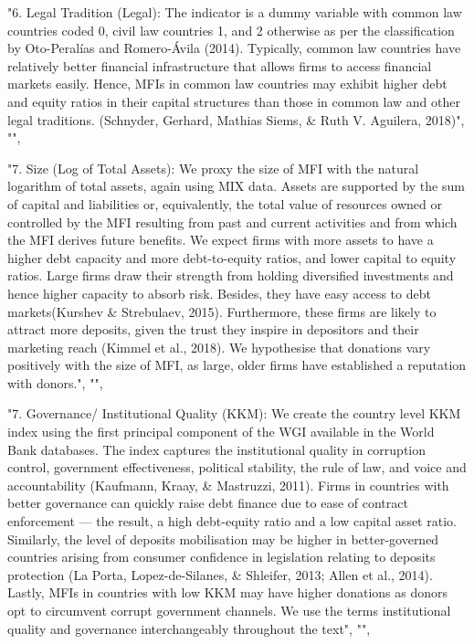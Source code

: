 \documentclass[a4paper,nobind]{templates/ociamthesis}
\newenvironment{Shaded}{\begin{snugshade}}{\end{snugshade}}
\newcommand{\NormalTok}[1]{#1}
\newcommand{\StringTok}[1]{\textcolor[rgb]{0.31,0.60,0.02}{#1}}
\renewenvironment{Shaded}
{
  \vspace{10pt}%
  \begin{snugshade}%
}{%
  \end{snugshade}%
  \vspace{8pt}%
}
\begin{document}
\begin{Shaded}
\begin{Highlighting}[]
\StringTok{"6. Legal Tradition (Legal): The indicator is a dummy variable with common law countries coded 0, civil law countries 1, and 2 otherwise as per the classification by Oto{-}Peralías and Romero{-}Ávila (2014). Typically, common law countries have relatively better financial infrastructure that allows firms to access financial markets easily. Hence, MFIs in common law countries may exhibit higher debt and equity ratios in their capital structures than those in common law and other legal traditions. (Schnyder, Gerhard, Mathias Siems, \& Ruth V. Aguilera, 2018)"}\NormalTok{, }\StringTok{""}\NormalTok{, }

\StringTok{"7. Size (Log of Total Assets): We proxy the size of MFI with the natural logarithm of total assets, again using MIX data. Assets are supported by the sum of capital and liabilities or, equivalently, the total value of resources owned or controlled by the MFI resulting from past and current activities and from which the MFI derives future benefits. We expect firms with more assets to have a higher debt capacity and more debt{-}to{-}equity ratios, and lower capital to equity ratios. Large firms draw their strength from holding diversified investments and hence higher capacity to absorb risk. Besides, they have easy access to debt markets(Kurshev \& Strebulaev, 2015). Furthermore, these firms are likely to attract more deposits, given the trust they inspire in depositors and their marketing reach (Kimmel et al., 2018). We hypothesise that donations vary positively with the size of MFI, as large, older firms have established a reputation with donors."}\NormalTok{, }\StringTok{""}\NormalTok{, }

\StringTok{"7. Governance/ Institutional Quality (KKM): We create the country level KKM index using the first principal component of the WGI available in the World Bank databases. The index captures the institutional quality in corruption control, government effectiveness, political stability, the rule of law, and voice and accountability (Kaufmann, Kraay, \& Mastruzzi, 2011). Firms in countries with better governance can quickly raise debt finance due to ease of contract enforcement — the result, a high debt{-}equity ratio and a low capital asset ratio. Similarly, the level of deposits mobilisation may be higher in better{-}governed countries arising from consumer confidence in legislation relating to deposits protection (La Porta, Lopez{-}de{-}Silanes, \& Shleifer, 2013; Allen et al., 2014). Lastly, MFIs in countries with low KKM may have higher donations as donors opt to circumvent corrupt government channels. We use the terms institutional quality and governance interchangeably throughout the text"}\NormalTok{, }\StringTok{""}\NormalTok{, }


\end{Highlighting}
\end{Shaded}
\end{document}
